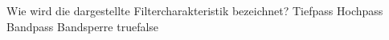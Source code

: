     {Wie wird die dargestellte Filtercharakteristik bezeichnet?}
    {Tiefpass}
    {Hochpass}
    {Bandpass}
    {Bandsperre}
    {true}{false}